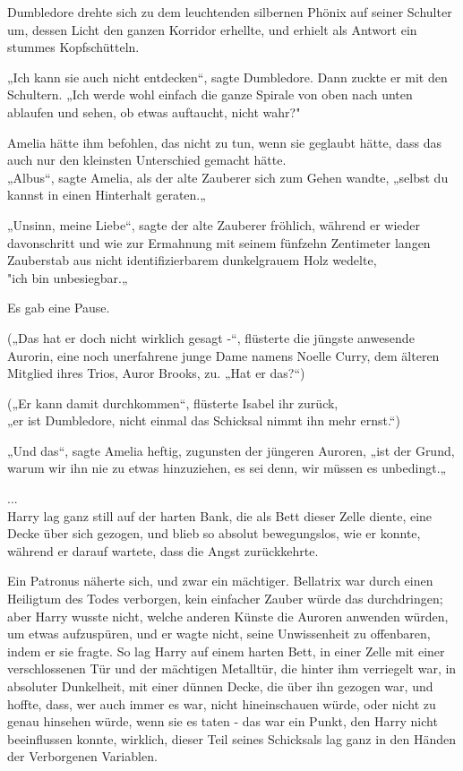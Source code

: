 {Dumbledore drehte sich zu dem leuchtenden silbernen Phönix auf seiner Schulter um, dessen Licht den ganzen Korridor erhellte, und erhielt als Antwort ein stummes Kopfschütteln.

„Ich kann sie auch nicht entdecken“, sagte Dumbledore. Dann zuckte er mit den Schultern. „Ich werde wohl einfach die ganze Spirale von oben nach unten ablaufen und sehen, ob etwas auftaucht, nicht wahr?"

Amelia hätte ihm befohlen, das nicht zu tun, wenn sie geglaubt hätte, dass das auch nur den kleinsten Unterschied gemacht hätte.\\ „Albus“, sagte Amelia, als der alte Zauberer sich zum Gehen wandte, „selbst du kannst in einen Hinterhalt geraten.„

„Unsinn, meine Liebe“, sagte der alte Zauberer fröhlich, während er wieder davonschritt und wie zur Ermahnung mit seinem fünfzehn Zentimeter langen Zauberstab aus nicht identifizierbarem dunkelgrauem Holz wedelte,\\ "ich bin unbesiegbar.„

Es gab eine Pause.

(„Das hat er doch nicht wirklich gesagt -“, flüsterte die jüngste anwesende Aurorin, eine noch unerfahrene junge Dame namens Noelle Curry, dem älteren Mitglied ihres Trios, Auror Brooks, zu. „Hat er das?“)

(„Er kann damit durchkommen“, flüsterte Isabel ihr zurück,\\ „er ist Dumbledore, nicht einmal das Schicksal nimmt ihn mehr ernst.“)

„Und das“, sagte Amelia heftig, zugunsten der jüngeren Auroren, „ist der Grund, warum wir ihn nie zu etwas hinzuziehen, es sei denn, wir müssen es unbedingt.„

...\\ Harry lag ganz still auf der harten Bank, die als Bett dieser Zelle diente, eine Decke über sich gezogen, und blieb so absolut bewegungslos, wie er konnte, während er darauf wartete, dass die Angst zurückkehrte.

Ein Patronus näherte sich, und zwar ein mächtiger. Bellatrix war durch einen Heiligtum des Todes verborgen, kein einfacher Zauber würde das durchdringen; aber Harry wusste nicht, welche anderen Künste die Auroren anwenden würden, um etwas aufzuspüren, und er wagte nicht, seine Unwissenheit zu offenbaren, indem er sie fragte. So lag Harry auf einem harten Bett, in einer Zelle mit einer verschlossenen Tür und der mächtigen Metalltür, die hinter ihm verriegelt war, in absoluter Dunkelheit, mit einer dünnen Decke, die über ihn gezogen war, und hoffte, dass, wer auch immer es war, nicht hineinschauen würde, oder nicht zu genau hinsehen würde, wenn sie es taten - das war ein Punkt, den Harry nicht beeinflussen konnte, wirklich, dieser Teil seines Schicksals lag ganz in den Händen der Verborgenen Variablen.

}
